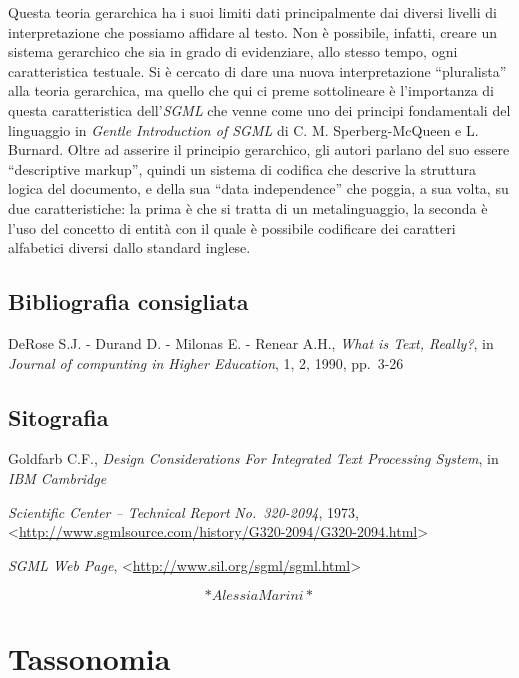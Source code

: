 \documentclass[
  b5paper,
  twoside,
  11pt,
  chapterprefix=false,
  bibliography=totocnumbered,
  listof=flat]{scrbook}
\begin{document}
Questa teoria gerarchica ha i suoi limiti dati principalmente dai
diversi livelli di interpretazione che possiamo affidare al testo. Non è
possibile, infatti, creare un sistema gerarchico che sia in grado di
evidenziare, allo stesso tempo, ogni caratteristica testuale. Si è
cercato di dare una nuova interpretazione \enquote{pluralista} alla teoria
gerarchica, ma quello che qui ci preme sottolineare è l'importanza di
questa caratteristica dell'\emph{SGML} che venne come uno dei principi
fondamentali del linguaggio in \emph{Gentle Introduction of SGML} di C. M.
Sperberg-McQueen e L. Burnard. Oltre ad asserire il principio
gerarchico, gli autori parlano del suo essere \enquote{descriptive markup},
quindi un sistema di codifica che descrive la struttura logica del
documento, e della sua \enquote{data independence} che poggia, a sua volta, su
due caratteristiche: la prima è che si tratta di un metalinguaggio, la
seconda è l'uso del concetto di entità con il quale è possibile
codificare dei caratteri alfabetici diversi dallo standard inglese.

\hypertarget{bibliografia-consigliata-22}{%
\section*{Bibliografia consigliata}\label{bibliografia-consigliata-22}}

DeRose S.J. - Durand D. - Milonas E. - Renear A.H., \emph{What is Text,
Really?}, in \emph{Journal of compunting in Higher Education}, 1, 2, 1990,
pp.~3-26

\hypertarget{sitografia-26}{%
\section*{Sitografia}\label{sitografia-26}}

Goldfarb C.F., \emph{Design Considerations For Integrated Text Processing
System}, in \emph{IBM Cambridge}

\emph{Scientific Center -- Technical Report} \emph{No.~320-2094}, 1973,
\textless{}\href{http://www.sgmlsource.com/history/G320-2094/G320-2094.html}{{http://www.sgmlsource.com/history/G320-2094/G320-2094.html}}\textgreater{}

\emph{SGML Web Page}, \textless{}{\url{http://www.sil.org/sgml/sgml.html}\textgreater{}}

\[*Alessia Marini*\]

\hypertarget{tassonomia}{%
\chapter{Tassonomia}\label{tassonomia}}
\end{document}
